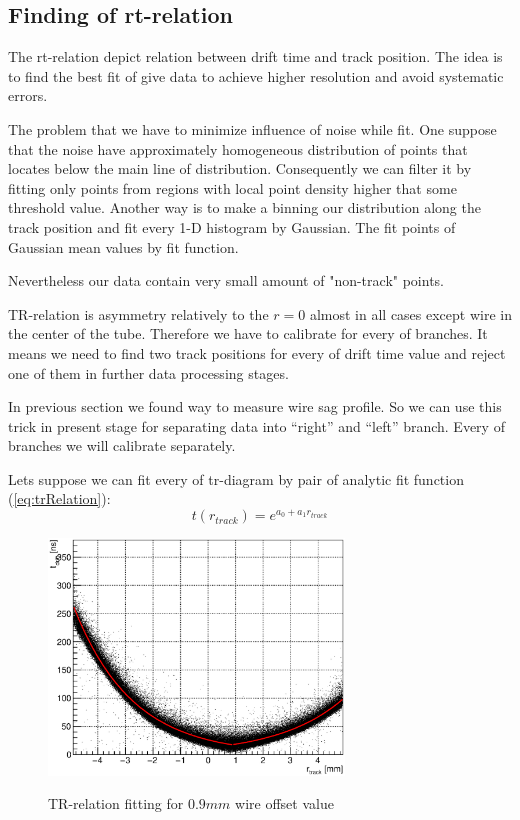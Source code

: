 \documentclass[]{article}
\begin{document}
	\subsection{Finding of rt-relation}
	
	The rt-relation depict relation between drift time and track position. The idea is to find the best fit of give data to achieve higher resolution and avoid systematic errors.
	
	The problem that we have to minimize influence of noise while fit. One suppose that the noise have approximately homogeneous distribution of points that locates below the main line of distribution. Consequently we can filter it by fitting only points from regions with local point density higher that some threshold value. Another way is to make a binning our distribution along the track position and fit every 1-D histogram by Gaussian. The fit points of Gaussian mean values by fit function.    
	
	Nevertheless our data contain very small amount of "non-track" points.
	
	TR-relation is asymmetry relatively to the $r=0$ almost in all cases except wire in the center of the tube. Therefore we have to calibrate for every of branches. It means we need to find two track positions for every of drift time value and reject one of them in further data processing stages.
	
	In previous section we found way to measure wire sag profile. So we can use this trick in present stage for separating data into ``right'' and ``left'' branch. Every of branches we will calibrate separately.
	
	Lets suppose we can fit every of tr-diagram by pair of analytic fit function (\ref{eq:trRelation}):
	\begin{equation}
	t(r_{track}) = e^{a_0 + a_1r_{track}}
	\label{eq:trRelation}
	\end{equation}
	
	\begin{figure}[h!]
	\centering
	\includegraphics[width=0.7\textwidth]{TRrelation_09_points}
	\label{fig:TRrelation09points}
	\caption{TR-relation fitting for $0.9 mm$ wire offset value}
	\end{figure}
	
\end{document}
